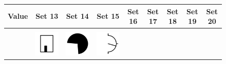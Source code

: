 \documentclass[doc]{apa6}
\newcommand{\stimulusscale}{.1}
\begin{document}
\begin{figure}[t]
\begin{center}
\footnotesize
\begin{tabular}{c|cccccccc}
Value & Set 13 & Set 14 & Set 15 & Set 16 & Set 17 & Set 18 & Set 19 & Set 20 \\ \hline
 \\
 \raisebox{.75cm}{55} &
\includegraphics[scale=\stimulusscale]{./set13stim55.png} &
\includegraphics[scale=\stimulusscale]{./set14stim55.png} &
\includegraphics[scale=\stimulusscale]{./set15stim55.png} &

\end{tabular}
\end{center}
\end{figure}
\end{document}
